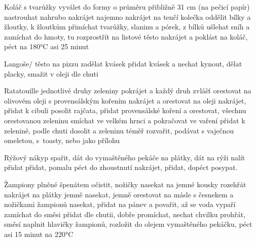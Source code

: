 \documentclass[12pt,a4paper]{article}
\begin{document}
\begin{recipe}{Koláč s tvarůžky}
   vyválet do formy o průměru přibližně 31 cm (na pečicí papír)
   nastrouhat nahrubo
   nakrájet najemno
   nakrájet na tenčí kolečka
   oddělit bílky a žloutky, k žloutkům přimíchat tvarůžky, slaninu a pórek, z bílků ušlehat sníh a zamíchat do hmoty, tu rozprostřít na listové těsto
   nakrájet a poklást na koláč, péct na 180°C asi 25 minut
\end{recipe}
\newpage

\begin{recipe}{Langoše/ těsto na pizzu}
   zadělat kvásek
   přidat kvásek a nechat kynout, dělat placky, smažit v oleji
   dle chuti
\end{recipe}
\newpage

\begin{recipe}{Ratatouille}
   jednotlivé druhy zeleniny pokrájet a každý druh zvlášť orestovat na olivovém oleji s provensálským kořením
   nakrájet a orestovat na oleji
   nakrájet, přidat k cibuli
   posolit rajčata, přidat provensálské koření a orestovat, všechnu orestovanou zeleninu smíchat ve velkém hrnci a pokračovat ve vaření
   přidat k zelenině, podle chuti dosolit a zeleninu téměř rozvařit, podávat s vaječnou omeletou, s~toasty, nebo jako přílohu
\end{recipe}
\newpage

\begin{recipe}{Rýžový nákyp}
   spařit, dát do vymaštěného pekáče
   na plátky, dát na rýži
   nalít
   přidat
   přidat, pomalu péct do zhoustnutí
   nakrájet, přidat, dopéct
   posypat.
\end{recipe}
\newpage

\begin{recipe}{Žampiony plněné špenátem}
   očistit, nožičky nasekat na jemné kousky
   rozehřát
   nakrájet na plátky
   jemně nasekat, jemně orestovat na másle s česnekem a nožičkami žampionů
   nasekat, přidat na pánev a povařit, až se voda vypaří
   zamíchat do směsi
   přidat dle chutii, dobře promíchat, nechat chvilku prohřát, směsí naplnit hlavičky žampionů, rozložit do olejem vymaštěného pekáčku, péct asi 15 minut na 220°C
\end{recipe}
\newpage
\end{document}
